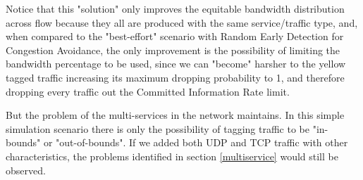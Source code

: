 \documentclass[conference,compsoc]{IEEEtran}
\begin{document}
     Notice that this "solution" only improves the equitable bandwidth distribution across flow because they all are produced with the same service/traffic type, and, when compared to the "best-effort" scenario with Random Early Detection for Congestion Avoidance, the only improvement is the possibility of limiting the bandwidth percentage to be used, since we can "become" harsher to the yellow tagged traffic increasing its maximum dropping probability to 1, and therefore dropping every traffic out the Committed Information Rate limit. \par
     But the problem of the multi-services in the network maintains. In this simple simulation scenario there is only the possibility of tagging traffic to be "in-bounds" or "out-of-bounds". If we added both UDP and TCP traffic with other characteristics, the problems identified in section \ref{multiservice} would still be observed.
     

     
\end{document}
